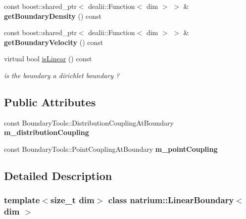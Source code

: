 \begin{DoxyCompactItemize}
\item 
\hypertarget{classnatrium_1_1LinearBoundary_a4ab782e9dbe542a24267f157d8af697d}{
const boost::shared\_\-ptr$<$ dealii::Function$<$ dim $>$ $>$ \& {\bfseries getBoundaryDensity} () const }
\label{classnatrium_1_1LinearBoundary_a4ab782e9dbe542a24267f157d8af697d}

\item 
\hypertarget{classnatrium_1_1LinearBoundary_a5b8333175d95f42872795fb8a5c261a7}{
const boost::shared\_\-ptr$<$ dealii::Function$<$ dim $>$ $>$ \& {\bfseries getBoundaryVelocity} () const }
\label{classnatrium_1_1LinearBoundary_a5b8333175d95f42872795fb8a5c261a7}

\item 
\hypertarget{classnatrium_1_1LinearBoundary_a80639c46ec11a51db8a2ff33f3ab3bf7}{
virtual bool \hyperlink{classnatrium_1_1LinearBoundary_a80639c46ec11a51db8a2ff33f3ab3bf7}{isLinear} () const }
\label{classnatrium_1_1LinearBoundary_a80639c46ec11a51db8a2ff33f3ab3bf7}

\begin{DoxyCompactList}\small\item\em is the boundary a dirichlet boundary ? \item\end{DoxyCompactList}\end{DoxyCompactItemize}
\subsection*{Public Attributes}
\begin{DoxyCompactItemize}
\item 
\hypertarget{classnatrium_1_1LinearBoundary_ab77872e8f33340311322ff7609565b99}{
const BoundaryTools::DistributionCouplingAtBoundary {\bfseries m\_\-distributionCoupling}}
\label{classnatrium_1_1LinearBoundary_ab77872e8f33340311322ff7609565b99}

\item 
\hypertarget{classnatrium_1_1LinearBoundary_acadcd1c87647831d7e45228df016ed46}{
const BoundaryTools::PointCouplingAtBoundary {\bfseries m\_\-pointCoupling}}
\label{classnatrium_1_1LinearBoundary_acadcd1c87647831d7e45228df016ed46}

\end{DoxyCompactItemize}


\subsection{Detailed Description}
\subsubsection*{template$<$size\_\-t dim$>$ class natrium::LinearBoundary$<$ dim $>$}

